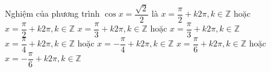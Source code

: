 \begin{ex}%
	Nghiệm của phương trình $\cos x=\dfrac{\sqrt{2}}{2}$ là
	\choice
	{$x=\dfrac{\pi}{2}+k2\pi,k\in\mathbb{Z}$ hoặc $x=\dfrac{\pi}{2}+k2\pi,k\in\mathbb{Z}$}
	{$x=\dfrac{\pi}{3}+k2\pi,k\in\mathbb{Z}$ hoặc $x=\dfrac{\pi}{3}+k2\pi,k\in\mathbb{Z}$}
	{\True $x=\dfrac{\pi}{4}+k2\pi, k\in\mathbb{Z}$ hoặc $x=-\dfrac{\pi}{4}+k2\pi,k\in\mathbb{Z}$}
	{$x=\dfrac{\pi}{6}+k2\pi, k\in\mathbb{Z}$ hoặc $x=-\dfrac{\pi}{6}+k2\pi,k\in\mathbb{Z}$}
\end{ex}

